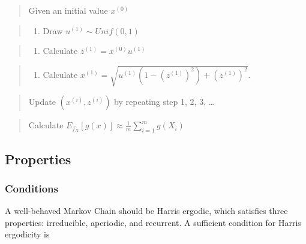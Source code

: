 \documentclass[12pt]{article}
\providecommand{\tightlist}{%
  \setlength{\itemsep}{0pt}\setlength{\parskip}{0pt}}
\begin{document}
\begin{quote}
Given an initial value \(x^{(0)}\)
\end{quote}

\begin{quote}
\begin{enumerate}
\def\labelenumi{\arabic{enumi}.}
\tightlist
\item
  Draw \(u^{(1)} \sim Unif(0,1)\)
\end{enumerate}
\end{quote}

\begin{quote}
\begin{enumerate}
\def\labelenumi{\arabic{enumi}.}
\setcounter{enumi}{1}
\tightlist
\item
  Calculate \(z^{(1)} =x^{(0)}u^{(1)}\)
\end{enumerate}
\end{quote}

\begin{quote}
\begin{enumerate}
\def\labelenumi{\arabic{enumi}.}
\setcounter{enumi}{2}
\tightlist
\item
  Calculate \(x^{(1)} =\sqrt{u^{(1)}(1-(z^{(1)})^2)+(z^{(1)})^2}\).
\end{enumerate}
\end{quote}

\begin{quote}
Update \((x^{(i)},z^{(i)})\) by repeating step 1, 2, 3, \ldots{}
\end{quote}

\begin{quote}
Calculate \(E_{f_{X}}[g(x)]\approx\frac{1}{m}\sum_{i=1}^m g(X_i)\)
\end{quote}

\hypertarget{properties}{%
\subsection{Properties}\label{properties}}

\hypertarget{conditions}{%
\subsubsection{Conditions}\label{conditions}}

A well-behaved Markov Chain should be Harris ergodic, which satisfies
three properties: irreducible, aperiodic, and recurrent. A sufficient
condition for Harris ergodicity is
\end{document}
